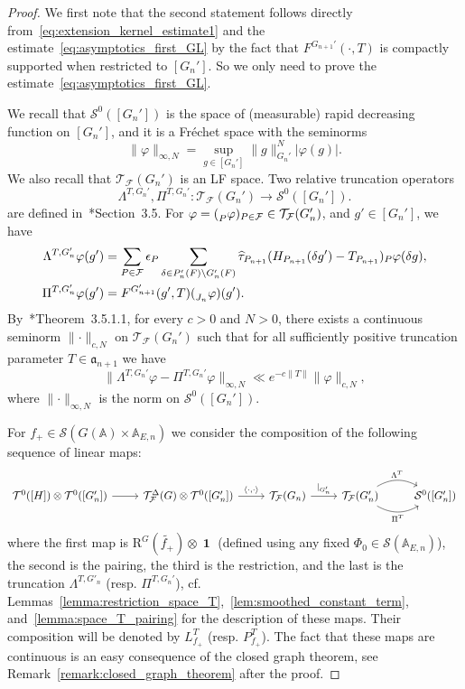 \documentclass[letterpaper,11pt]{amsart}
\newcommand{\fa}{\mathfrak{a}}
\newcommand{\bA}{\mathbb{A}}
\newcommand{\cF}{\mathcal{F}}
\newcommand{\cS}{\mathcal{S}}
\newcommand{\cT}{\mathcal{T}}
\newcommand{\<}{\negthickspace}
\providecommand{\abs}[1]{\lvert#1\rvert}
\providecommand{\aabs}[1]{\lVert#1\rVert}
\DeclareMathOperator{\id}{\mathbf{1}}
\theoremstyle{definition}
\theoremstyle{plain}
\theoremstyle{remark}
\numberwithin{equation}{section}
\begin{document}
\begin{proof}
We first note that the second statement follows directly from~\eqref{eq:extension_kernel_estimate1} and the
estimate~\eqref{eq:asymptotics_first_GL} by the fact that
$F^{G_{n+1}'}(\cdot, T)$ is compactly supported when restricted to $[G_n']$. So
we only need to prove the estimate~\eqref{eq:asymptotics_first_GL}.

We recall that $\cS^0([G_n'])$ is the space of (measurable) rapid decreasing function on
$[G_n']$, and it is a Fr\'{e}chet space with the seminorms
    \[
    \aabs{\varphi}_{\infty, N}  = \sup_{g \in [G_n']}
    \aabs{g}_{G_n'}^N \abs{\varphi(g)}.
    \]
We also recall that $\cT_{\cF}(G_n')$ is an LF space. Two
relative truncation operators
    \[
    \Lambda^{T, G_n'}, \Pi^{T, G_n'}:
    \cT_{\cF} (G_n') \to \cS^0([G_n']).
    \]
are defined in~\cite{BPCZ}*{Section~3.5}. For
$\varphi=(\prescript{}{P}{\varphi})_{P \in \cF} \in
\cT_{\cF}(G_n')$, and $g' \in [G_n']$, we have
    \[
    \begin{aligned}
    \Lambda^{T,G_n'}\varphi(g')
    &= \sum_{P \in \cF} \epsilon_P \sum_{\delta \in P_n'(F)
    \backslash G_n'(F)} \widehat{\tau}_{P_{n+1}}
    (H_{P_{n+1}}(\delta g')-T_{P_{n+1}}) {}_P \varphi(\delta g),\\
    \Pi^{T,G_n'}\varphi(g')
    &=F^{G_{n+1}'}(g',T) (\prescript{}{J_n}{\varphi})(g').
    \end{aligned}
    \]
By~\cite{BPCZ}*{Theorem~3.5.1.1}, for every $c>0$ and $N>0$, there exists a
continuous seminorm $\aabs{\cdot}_{c,N}$ on $\cT_{\cF}(G_n')$
such that for all sufficiently positive truncation parameter $T \in
\fa_{n+1}$ we have
    \begin{equation} \label{eq:mixed_truncation}
    \aabs{  \Lambda^{T,G_n'} \varphi - \Pi^{T,G_n'} \varphi }_{\infty,N}
    \ll e^{-c\|T\|}  \aabs{\varphi}_{c,N} ,
    \end{equation}
where $\aabs{ \cdot }_{\infty,N}$ is the norm on $\cS^0([G_n'])$.

For $f_+ \in \cS(G(\bA) \times \bA_{E, n})$ we consider the composition of
the following sequence of linear maps:
    \[
    \begin{tikzcd}
{\cT^0([H])\otimes \cT^0([G_n'])} \arrow[r] & {\cT_{\cF}^\Delta(G) \otimes \cT^0([G_n'])} \arrow[r, "{\langle \cdot,\cdot \rangle}"] & \cT_{\cF}(G_n) \arrow[r, "|_{G_n'}"] & \cT_{\cF}(G'_n) \arrow[r, "\Lambda^T", bend left] \arrow[r, "\Pi^T"', bend right] & {\cS^0([G_n'])}
\end{tikzcd}
    \]
where the first map is $\mathrm{R}^G(\widetilde{f_+}) \otimes \id$ (defined
using any fixed $\Phi_0 \in \cS(\bA_{E, n})$), the second is the pairing,
the third is the restriction, and the last is the truncation $\Lambda^{T,
G'_n}$ (resp. $\Pi^{T,G_n'}$), cf.
Lemmas~\ref{lemma:restriction_space_T},~\ref{lem:smoothed_constant_term},
and~\ref{lemma:space_T_pairing} for the description of these maps. Their composition will
be denoted by $L_{f_+}^T$ (resp. $P_{f_+}^T$). The fact that these maps are continuous is an easy consequence of the closed
graph theorem, see Remark~\ref{remark:closed_graph_theorem} after the proof.


\end{proof}
\end{document}
